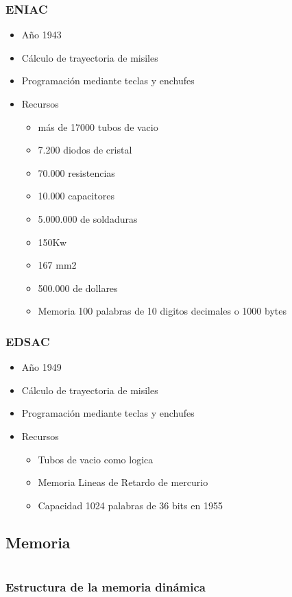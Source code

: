 \documentclass{beamer}
\begin{document}
\begin{frame}
\frametitle{ENIAC}
\begin{itemize}
	\item Año 1943
	\item Cálculo de trayectoria de misiles
	\item Programación mediante teclas y enchufes
	\item Recursos
		\begin{itemize}
			\item más de 17000 tubos de vacio
			\item 7.200 diodos de cristal
			\item 70.000 resistencias
			\item 10.000 capacitores
			\item 5.000.000 de soldaduras
			\item 150Kw
			\item 167 mm2
			\item 500.000 de dollares
			\item Memoria 100 palabras de 10 digitos decimales o 1000 bytes
		\end{itemize}
\end{itemize}
\end{frame}

\begin{frame}
\frametitle{EDSAC}
\begin{itemize}
	\item Año 1949
	\item Cálculo de trayectoria de misiles
	\item Programación mediante teclas y enchufes
	\item Recursos
		\begin{itemize}
			\item Tubos de vacio como logica
			\item Memoria Lineas de Retardo de mercurio
			\item Capacidad 1024 palabras de 36 bits en 1955
		\end{itemize}
\end{itemize}
\end{frame}

\subsection{Memoria}
\section{}
\begin{frame}
\frametitle{Estructura de la  memoria dinámica}
\end{frame}
\end{document}
